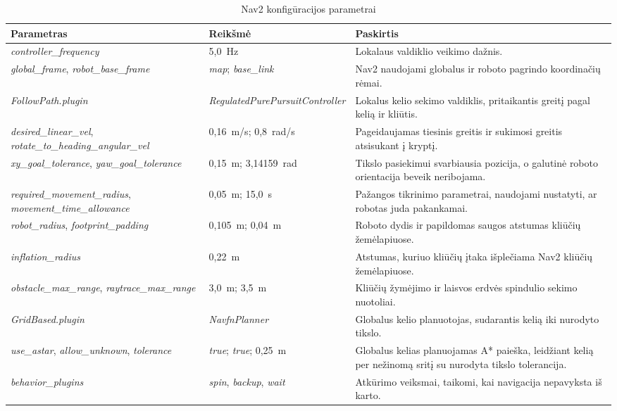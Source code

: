\documentclass[]{VUMIFTemplateClass}
\begin{document}
\begin{table}[H]
\centering
\caption{Nav2 konfigūracijos parametrai}
\label{tab:nav2-params}
\small
\begin{tabular}{|p{}|p{}|p{}|}
\hline
\textbf{Parametras} & \textbf{Reikšmė} & \textbf{Paskirtis} \\
\hline
\textit{controller\_frequency} & 5,0~Hz & Lokalaus valdiklio veikimo dažnis. \\
\hline
\textit{global\_frame}, \textit{robot\_base\_frame} & \textit{map}; \textit{base\_link} & Nav2 naudojami globalus ir roboto pagrindo koordinačių rėmai. \\
\hline
\textit{FollowPath.plugin} & \textit{RegulatedPurePursuitController} & Lokalus kelio sekimo valdiklis, pritaikantis greitį pagal kelią ir kliūtis. \\
\hline
\textit{desired\_linear\_vel}, \textit{rotate\_to\_heading\_angular\_vel} & 0,16~m/s; 0,8~rad/s & Pageidaujamas tiesinis greitis ir sukimosi greitis atsisukant į kryptį. \\
\hline
\textit{xy\_goal\_tolerance}, \textit{yaw\_goal\_tolerance} & 0,15~m; 3,14159~rad & Tikslo pasiekimui svarbiausia pozicija, o galutinė roboto orientacija beveik neribojama. \\
\hline
\textit{required\_movement\_radius}, \textit{movement\_time\_allowance} & 0,05~m; 15,0~s & Pažangos tikrinimo parametrai, naudojami nustatyti, ar robotas juda pakankamai. \\
\hline
\textit{robot\_radius}, \textit{footprint\_padding} & 0,105~m; 0,04~m & Roboto dydis ir papildomas saugos atstumas kliūčių žemėlapiuose. \\
\hline
\textit{inflation\_radius} & 0,22~m & Atstumas, kuriuo kliūčių įtaka išplečiama Nav2 kliūčių žemėlapiuose. \\
\hline
\textit{obstacle\_max\_range}, \textit{raytrace\_max\_range} & 3,0~m; 3,5~m & Kliūčių žymėjimo ir laisvos erdvės spindulio sekimo nuotoliai. \\
\hline
\textit{GridBased.plugin} & \textit{NavfnPlanner} & Globalus kelio planuotojas, sudarantis kelią iki nurodyto tikslo. \\
\hline
\textit{use\_astar}, \textit{allow\_unknown}, \textit{tolerance} & \textit{true}; \textit{true}; 0,25~m & Globalus kelias planuojamas A* paieška, leidžiant kelią per nežinomą sritį su nurodyta tikslo tolerancija. \\
\hline
\textit{behavior\_plugins} & \textit{spin}, \textit{backup}, \textit{wait} & Atkūrimo veiksmai, taikomi, kai navigacija nepavyksta iš karto. \\
\hline
\end{tabular}
\end{table}
\end{document}
